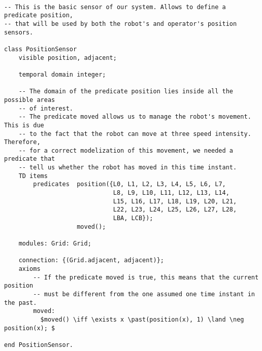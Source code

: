 \begin{lstlisting}[fontadjust, mathescape, frame=single]

-- This is the basic sensor of our system. Allows to define a predicate position,
-- that will be used by both the robot's and operator's position sensors.

class PositionSensor
    visible position, adjacent;

    temporal domain integer;
    
    -- The domain of the predicate position lies inside all the possible areas
    -- of interest. 
    -- The predicate moved allows us to manage the robot's movement. This is due
    -- to the fact that the robot can move at three speed intensity. Therefore, 
    -- for a correct modelization of this movement, we needed a predicate that 
    -- tell us whether the robot has moved in this time instant.
    TD items 
        predicates  position({L0, L1, L2, L3, L4, L5, L6, L7,
                              L8, L9, L10, L11, L12, L13, L14,
                              L15, L16, L17, L18, L19, L20, L21,
                              L22, L23, L24, L25, L26, L27, L28,
                              LBA, LCB});
                    moved();

    modules: Grid: Grid;

    connection: {(Grid.adjacent, adjacent)};
    axioms
        -- If the predicate moved is true, this means that the current position
        -- must be different from the one assumed one time instant in the past.
        moved: 
          $moved() \iff \exists x \past(position(x), 1) \land \neg position(x); $

end PositionSensor.
\end{lstlisting}